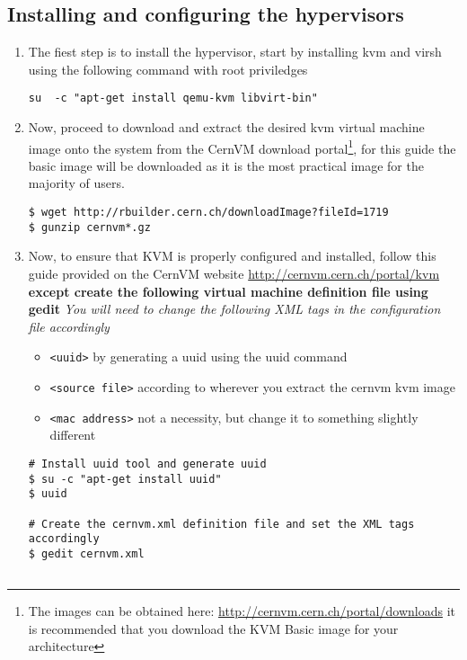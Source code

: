 \subsection{Installing and configuring the hypervisors}
\begin{enumerate}
\item The fiest step is to install the hypervisor, start by installing kvm and virsh using the following command with root priviledges
\lstset{caption=Installing KVM and Virsh Support}
\begin{lstlisting}
su 	-c "apt-get install qemu-kvm libvirt-bin"
\end{lstlisting}

\item Now, proceed to download and extract the desired kvm virtual machine image onto the system from the CernVM download portal\footnote{The images can be obtained here: \url{http://cernvm.cern.ch/portal/downloads} it is recommended that you download the KVM Basic image for your architecture}, for this guide the
basic image will be downloaded as it is the most practical image for the majority of users.

\lstset{caption=Download and Extract CernVM KVM Basic Image}
\begin{lstlisting}
$ wget http://rbuilder.cern.ch/downloadImage?fileId=1719
$ gunzip cernvm*.gz
\end{lstlisting}

\item Now, to ensure that KVM is properly configured and installed, follow this guide provided on the CernVM website
\url{http://cernvm.cern.ch/portal/kvm} {\bf except create the following virtual machine definition file using gedit}
\emph{You will need to change the following XML tags in the configuration file accordingly}
\begin{itemize}
\item \verb|<uuid>| by generating a uuid using the uuid command
\item \verb|<source file>| according to wherever you extract the cernvm kvm image
\item \verb|<mac address>| not a necessity, but change it to something slightly different
\end{itemize}

\lstset{caption=Create CernVM KVM Definition File}
\begin{lstlisting}
# Install uuid tool and generate uuid
$ su -c "apt-get install uuid"
$ uuid

# Create the cernvm.xml definition file and set the XML tags accordingly
$ gedit cernvm.xml


\end{lstlisting}
\end{enumerate}
